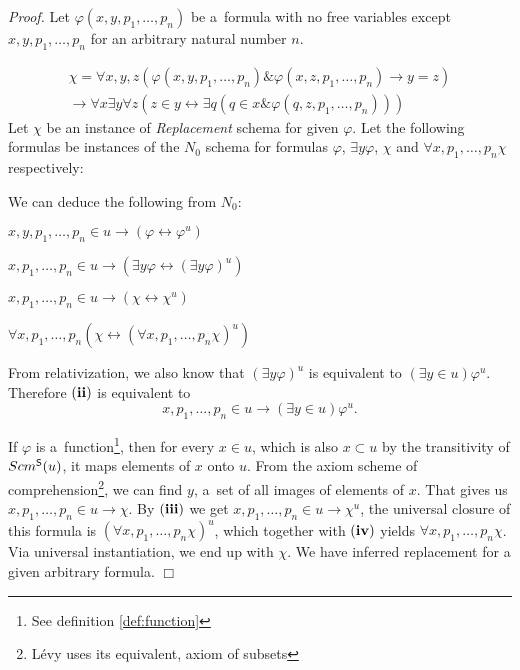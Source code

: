 \documentclass[12pt,a4paper]{article}
\newenvironment{proof}
{\noindent \textit{Proof.}}
{\hspace*{\fill} $\Box$}
\renewcommand{\iff}{\leftrightarrow}
\newcommand{\then}{\rightarrow}
\newcommand{\bce}{\begin{compactenum}}
\newcommand{\ece}{\end{compactenum}}
\newcommand{\et}{\mathrel{\&}}
\begin{document}
\begin{proof}
Let $\varphi(x, y, p_1, \ldots, p_n)$ be a~formula with no free variables except $x, y, p_1, \ldots, p_n$ for an arbitrary natural number $n$.

\begin{equation}
\begin{gathered}
\chi = \forall x, y, z(\varphi(x, y, p_1, \ldots, p_n) \et \varphi(x, z, p_1, \ldots, p_n) \then y = z) \\
\then \forall x \exists y \forall z (z \in y \iff \exists q (q \in x \et \varphi(q, z, p_1, \ldots, p_n)))
\end{gathered}
\end{equation}
Let $\chi$ be an instance of \emph{Replacement} schema for given $\varphi$. Let the following formulas be instances of the $N_0$ schema for formulas  $\varphi$, $\exists y \varphi$, $\chi$ and $\forall x, p_1, \ldots, p_n \chi$ respectively:

We can deduce the following from $N_0$: 
\bce[(i)]
\item $x, y, p_1, \ldots, p_n \in u \then (\varphi \iff \varphi^{u}) $
\item $x, p_1, \ldots, p_n \in u \then (\exists y \varphi \iff (\exists y \varphi)^{u})$
\item $x, p_1, \ldots, p_n \in u \then (\chi \iff \chi^{u})$
\item $\forall x, p_1, \ldots, p_n (\chi \iff (\forall x, p_1, \ldots, p_n \chi)^{u})$
\ece

From relativization, we also know that $(\exists y \varphi)^{u}$ is equivalent to $(\exists y \in u) \varphi^{u}$.
Therefore $\bold{(ii)}$ is equivalent to
\begin{equation}
x, p_1, \ldots, p_n \in u \then (\exists y \in u) \varphi^{u}. 
\end{equation}

If $\varphi$ is a~function\footnote{See definition \ref{def:function}}, then for every $x \in u$, which is also $x \subset u$ by the transitivity of $Scm^{\sf{S}}(u)$,
it maps elements of $x$ onto $u$. From the axiom scheme of comprehension\footnote{Lévy uses its equivalent, axiom of subsets}, we can find $y$, a~set of all images of elements of $x$.
That gives us $x, p_1, \ldots, p_n \in u \then \chi$. By $\bold{(iii)}$ we get $x, p_1, \ldots, p_n \in u \then \chi^{u}$, the universal closure of this formula is $(\forall x, p_1, \ldots, p_n \chi)^{u}$, 
which together with $\bold{(iv)}$ yields $\forall x, p_1, \ldots, p_n \chi$. Via universal instantiation, we end up with $\chi$. We have inferred replacement for a given arbitrary formula. 
\end{proof}
\end{document}
